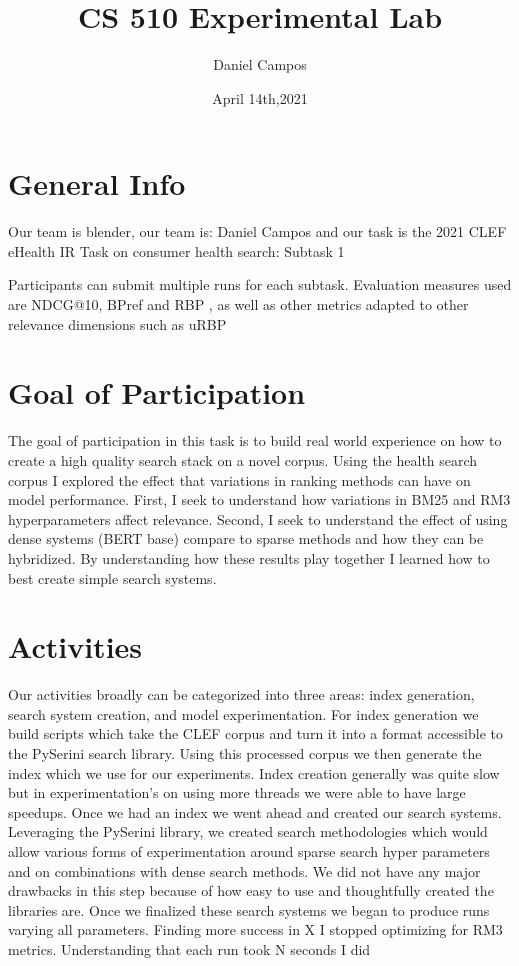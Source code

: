 \documentclass[11pt]{article}
\title{CS 510 Experimental Lab}
\author{Daniel Campos}
\date{April 14th,2021}
\begin{document}
\maketitle
\section{General Info}
Our team is blender, our team is: Daniel Campos and our task is the 2021 CLEF eHealth IR Task on consumer health search: Subtask 1

Participants can submit multiple runs for each subtask. Evaluation measures used are NDCG@10, BPref and RBP , as well as other metrics adapted to other relevance dimensions such as uRBP
\section{Goal of Participation}
The goal of participation in this task is to build real world experience on how to create a high quality search stack on a novel corpus. Using the health search corpus I explored the effect that variations in ranking methods can have on model performance. First, I seek to understand how variations in BM25 and RM3 hyperparameters affect relevance. Second, I seek to understand the effect of using dense systems (BERT base) compare to sparse methods and how they can be hybridized. By understanding how these results play together I learned how to best create simple search systems. 
\section{Activities}
Our activities broadly can be categorized into three areas: index generation, search system creation, and model experimentation. For index generation we build scripts which take the CLEF corpus and turn it into a format accessible to the PySerini search library. Using this processed corpus we then generate the index which we use for our experiments. Index creation generally was quite slow but in experimentation's on using more threads we were able to have large speedups. Once we had an index we went ahead and created our search systems. Leveraging the PySerini library, we created search methodologies which would allow various forms of experimentation around sparse search hyper parameters and on combinations with dense search methods. We did not have any major drawbacks in this step because of how easy to use and thoughtfully created the libraries are. Once we finalized these search systems we began to produce runs varying all parameters.
Finding more success in X I stopped optimizing for RM3 metrics. Understanding that each run took N seconds I did 
\end{document}
